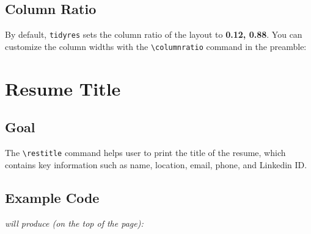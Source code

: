 \documentclass[a4paper, 10pt]{article}
\begin{document}
\subsection{Column Ratio}
By default, {\tt tidyres} sets the column ratio of the layout to
{\bf 0.12, 0.88}. You can customize the column widths with the
\verb+\columnratio+ command in the preamble:

\begin{codebox}[title = Column Ratio]
\end{codebox}

\newpage

\section{Resume Title}

\subsection{Goal}
The \verb+\restitle+ command helps user to print the title of the resume, which
contains key information such as name, location, email, phone, and Linkedin ID.\\

\subsection{Example Code}
\begin{codebox}[title = Resume Title Example Code]
\end{codebox}

\vspace{1cm}

{\it will produce (on the top of the page):}

\vspace{1cm}

\begin{tcolorbox}[standard jigsaw, opacityback = 0.1, colback = gray, boxrule = 0.5pt]
\end{tcolorbox}

\vspace{1cm}
\end{document}
